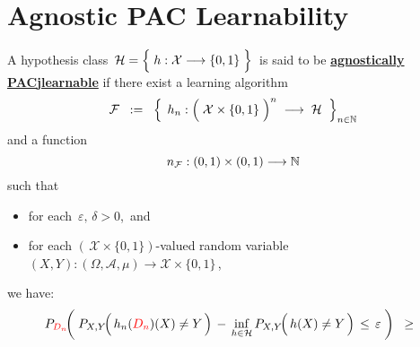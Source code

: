 

\section{Agnostic PAC Learnability}
\setcounter{theorem}{0}
\setcounter{equation}{0}


\renewcommand{\theenumi}{\roman{enumi}}
\renewcommand{\labelenumi}{\textnormal{(\theenumi)}$\;\;$}


\begin{definition}
\mbox{}\vskip 0.1cm
\noindent
A hypothesis class
\,$\mathcal{H} = \left\{\; h : \mathcal{X} \overset{{\color{white}-}}{\longrightarrow} \{0,1\} \;\right\}$\,
is said to be \underline{\textbf{agnostically PAC{\color{white}j}learnable}} if
there exist
a learning algorithm
\begin{equation*}
\mathcal{F}
\;\; : = \;\;
	\left\{\;\,
		h_{n} : \left(\;\mathcal{X} \overset{{\color{white}.}}{\times} \{0,1\} \;\right)^{n}
		\; \longrightarrow \;\mathcal{H}
		\;\;\right\}_{n\in\N}
\end{equation*}
and a function
\begin{equation*}
n_{\mathcal{F}} : (0,1) \times (0,1) \longrightarrow \mathbb{N}
\end{equation*}
such that
\begin{itemize}
\item
	for each \,$\varepsilon,\, \delta > 0$,\, and
\item
	for each $\left(\,\mathcal{X}\times\{0,1\}\right)$-valued random variable
	$(X,Y) : (\Omega,\mathcal{A},\mu) \longrightarrow \mathcal{X}\times\{0,1\}$\,,
\end{itemize}
we have:
\begin{equation*}
P_{{\color{red}D_{n}}}\!\!\left(\;
	P_{X,Y}\!\!\left(\,\overset{{\color{white}.}}{h}_{n}({\color{red}D_{n}})(X) \neq Y \,\right)
		\,-\,
		\underset{h\in\mathcal{H}}{\inf}\,P_{X,Y}\!\!\left(\,\overset{{\color{white}.}}{h}(X) \neq Y \,\right)
	\,\leq\,
		\varepsilon
	\;\right)
\;\; \geq \;\;

\end{equation*}
\end{definition}
